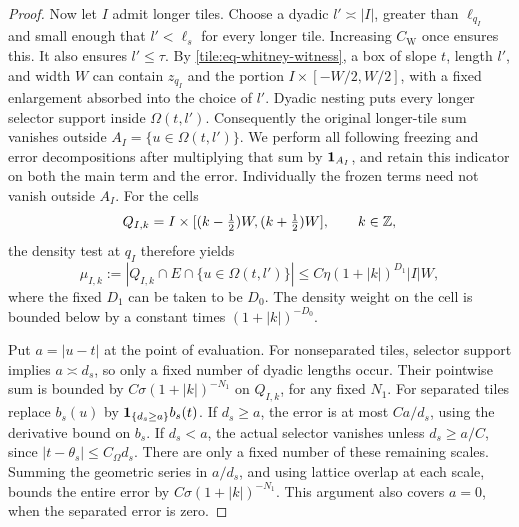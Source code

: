 \begin{proof}
Now let \(I\) admit longer tiles.  Choose a
dyadic \(l'\asymp |I|\), greater than
\(\ell_{q_I}\) and small enough that
\(l'<\ell_s\) for every longer tile.
Increasing \(C_{\mathrm W}\) once ensures this.
It also ensures \(l'\leq\tau\).  By
\eqref{tile:eq-whitney-witness}, a box of
slope \(t\), length \(l'\), and width \(W\)
can contain \(z_{q_I}\) and the portion
\(I\times[-W/2,W/2]\), with a fixed
enlargement absorbed into the choice of
\(l'\).  Dyadic nesting puts every longer
selector support inside \(\Omega(t,l')\).
Consequently the original longer-tile sum vanishes outside
\(A_I=\{u\in\Omega(t,l')\}\).  We perform all following
freezing and error decompositions after multiplying that
sum by \(\mathbf 1_{A_I}\), and retain this indicator on both
the main term and the error.  Individually the frozen
terms need not vanish outside \(A_I\).
For the cells
\[
 Q_{I,k}=I\times[(k-\tfrac12)W,(k+\tfrac12)W],
       \qquad k\in\mathbb Z,
\]
the density test at \(q_I\) therefore yields
\begin{equation}\label{tile:eq-cell-density}
 \mu_{I,k}:=
 |Q_{I,k}\cap E\cap\{u\in\Omega(t,l')\}|
 \leq C\eta(1+|k|)^{D_1}|I|W,
\end{equation}
where the fixed \(D_1\) can be taken to be
\(D_0\).  The density weight on the cell
is bounded below by a constant times
\((1+|k|)^{-D_0}\).

Put \(a=|u-t|\) at the point of evaluation.
For nonseparated tiles, selector support
implies \(a\asymp d_s\), so only a fixed
number of dyadic lengths occur.  Their
pointwise sum is bounded by
\(C\sigma(1+|k|)^{-N_1}\) on \(Q_{I,k}\),
for any fixed \(N_1\).  For separated
tiles replace \(b_s(u)\) by
\(\mathbf 1_{\{d_s\geq a\}}b_s(t)\).
If \(d_s\geq a\), the error is at most
\(Ca/d_s\), using the derivative bound
on \(b_s\).  If \(d_s<a\), the actual
selector vanishes unless \(d_s\geq a/C\),
since \(|t-\theta_s|\leq C_\Omega d_s\).
There are only a fixed number of these
remaining scales.  Summing the geometric
series in \(a/d_s\), and using lattice
overlap at each scale, bounds the entire
error by \(C\sigma(1+|k|)^{-N_1}\).
This argument also covers \(a=0\), when
the separated error is zero.


\end{proof}
